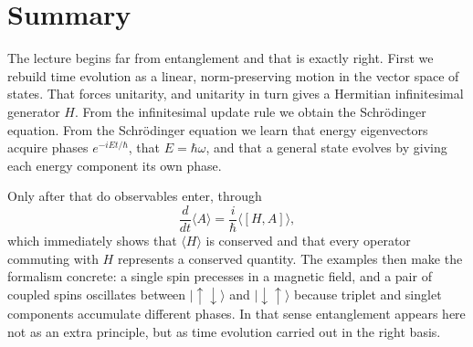 \section{Summary}

The lecture begins far from entanglement and that is exactly right. First we rebuild time evolution as a linear, norm-preserving motion in the vector space of states. That forces unitarity, and unitarity in turn gives a Hermitian infinitesimal generator \(H\). From the infinitesimal update rule we obtain the Schrödinger equation. From the Schrödinger equation we learn that energy eigenvectors acquire phases \(e^{-iEt/\hbar}\), that \(E=\hbar\omega\), and that a general state evolves by giving each energy component its own phase.

Only after that do observables enter, through
\begin{equation}
\frac{d}{dt}\langle A\rangle=\frac{i}{\hbar}\langle [H,A]\rangle,
\end{equation}
which immediately shows that \(\langle H\rangle\) is conserved and that every operator commuting with \(H\) represents a conserved quantity. The examples then make the formalism concrete: a single spin precesses in a magnetic field, and a pair of coupled spins oscillates between \(|\uparrow\downarrow\rangle\) and \(|\downarrow\uparrow\rangle\) because triplet and singlet components accumulate different phases. In that sense entanglement appears here not as an extra principle, but as time evolution carried out in the right basis.